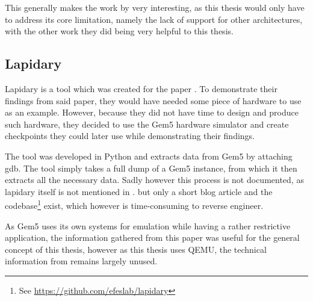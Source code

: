 This generally makes the work by \citeauthor{qpoints} very interesting,
as this thesis would only have to address its core limitation,
namely the lack of support for other architectures,
with the other work they did being very helpful to this thesis.

\subsection{Lapidary\cite{lapidary}}
Lapidary is a tool which was created for the paper .
To demonstrate their findings from said paper,
they would have needed some piece of hardware to use as an example.
However, because they did not have time to design and produce such hardware,
they decided to use the Gem5 hardware simulator\cite{gem5} and create checkpoints
they could later use while demonstrating their findings\cite{lapidary_story}.

The tool was developed in Python and extracts data from Gem5 by attaching gdb.
The tool simply takes a full dump of a Gem5 instance,
from which it then extracts all the necessary data.
Sadly however this process is not documented,
as lapidary itself is not mentioned in .
but only a short blog article\cite{lapidary_story}
and the codebase\footnote{See \url{https://github.com/efeslab/lapidary}} exist, which however is time-consuming to reverse engineer.

As Gem5 uses its own systems for emulation
while having a rather restrictive application,
the information gathered from this paper was useful for the general concept of this thesis,
however as this thesis uses QEMU, the technical information from \citeauthor{lapidary} remains largely unused.